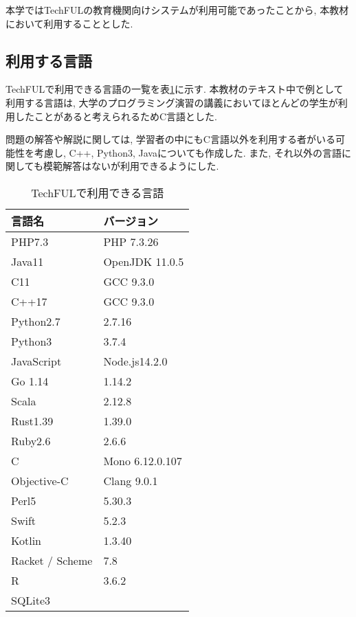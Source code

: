 本学ではTechFULの教育機関向けシステムが利用可能であったことから, 本教材において利用することとした. 



\subsection{利用する言語}

TechFULで利用できる言語の一覧を表\ref{tab:techful lang}に示す. 
本教材のテキスト中で例として利用する言語は, 大学のプログラミング演習の講義においてほとんどの学生が利用したことがあると考えられるためC言語とした. 

問題の解答や解説に関しては, 学習者の中にもC言語以外を利用する者がいる可能性を考慮し, C++, Python3, Javaについても作成した. 
また, それ以外の言語に関しても模範解答はないが利用できるようにした. 

\begin{table}[H]
    \caption{TechFULで利用できる言語}
    \label{tab:techful lang}
    \centering

    \begin{tabular}{|l||l|}
        \hline
        言語名 & バージョン \\ \hline
        \hline
        PHP7.3 & PHP 7.3.26 \\ \hline
        Java11 & OpenJDK 11.0.5\\ \hline
        C11 & GCC 9.3.0 \\ \hline
        C++17 & GCC 9.3.0\\ \hline
        Python2.7 & 2.7.16 \\ \hline
        Python3 & 3.7.4\\ \hline
        JavaScript & Node.js14.2.0\\ \hline
        Go 1.14& 1.14.2 \\ \hline
        Scala & 2.12.8\\ \hline
        Rust1.39 & 1.39.0\\ \hline
        Ruby2.6 & 2.6.6 \\ \hline
        C\sharp7 & Mono 6.12.0.107 \\ \hline
        Objective-C & Clang 9.0.1 \\ \hline
        Perl5 & 5.30.3 \\ \hline
        Swift & 5.2.3\\ \hline
        Kotlin & 1.3.40 \\ \hline
        Racket / Scheme & 7.8 \\ \hline
        R &  3.6.2 \\ \hline
        SQLite3 & \\ \hline
    \end{tabular}

\end{table}

